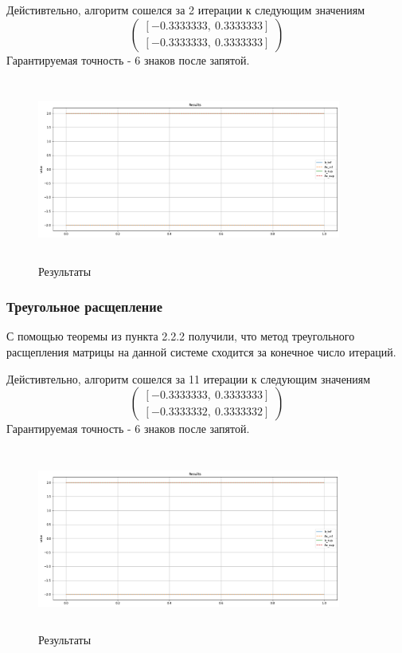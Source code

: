 \documentclass{article}
\begin{document}
    Дейстивтельно, алгоритм сошелся за 2 итерации к следующим значениям 
    \begin{equation*}
        \begin{pmatrix}
             [-0.3333333, \ 0.3333333] \\
             [-0.3333333, \ 0.3333333] 
        \end{pmatrix}
    \end{equation*}
    Гарантируемая точность - 6 знаков после запятой.
    \begin{figure}[H]
        \centering
        \includegraphics[width=10cm, height=6cm]{3.png}
        \caption{Результаты}
    \end{figure}
    
    
    \subsubsection{Треугольное расщепление}
    С помощью теоремы из пункта 2.2.2 получили, что метод треугольного расщепления матрицы на данной системе сходится за конечное число итераций.
    
    Дейстивтельно, алгоритм сошелся за 11 итерации к следующим значениям 
    \begin{equation*}
        \begin{pmatrix}
             [-0.3333333, \ 0.3333333] \\
             [-0.3333332, \ 0.3333332] 
        \end{pmatrix}
    \end{equation*}
    Гарантируемая точность - 6 знаков после запятой.
     \begin{figure}[H]
        \centering
        \includegraphics[width=10cm, height=6cm]{4.png}
        \caption{Результаты}
    \end{figure}
    
\end{document}
